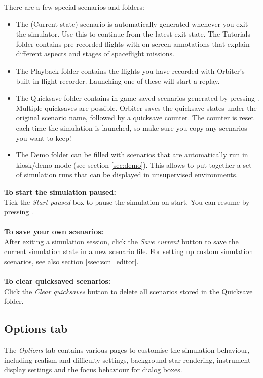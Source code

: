 \documentclass[Orbiter User Manual.tex]{subfiles}
\begin{document}
\begin{figure}[H]
	\centering
\end{figure}

\noindent
There are a few special scenarios and folders:

\begin{itemize}
\item The (Current state) scenario is automatically generated whenever you exit the simulator. Use this to continue from the latest exit state.
The Tutorials folder contains pre-recorded flights with on-screen annotations that explain different aspects and stages of spaceflight missions.
\item The Playback folder contains the flights you have recorded with Orbiter's built-in flight recorder. Launching one of these will start a replay.
\item The Quicksave folder contains in-game saved scenarios generated by pressing \Ctrl{}. Multiple quicksaves are possible. Orbiter saves the quicksave states under the original scenario name, followed by a quicksave counter. The counter is reset each time the simulation is launched, so make sure you copy any scenarios you want to keep!
\item The Demo folder can be filled with scenarios that are automatically run in kiosk/demo mode (see section \ref{sec:demo}). This allows to put together a set of simulation runs that can be displayed in unsupervised environments.
\end{itemize}

\noindent
\textbf{To start the simulation paused:}\\
Tick the \textit{Start paused} box to pause the simulation on start. You can resume by pressing \Ctrl{}.\\
\\
\textbf{To save your own scenarios:}\\
After exiting a simulation session, click the \textit{Save current} button to save the current simulation state in a new scenario file. For setting up custom simulation scenarios, see also section \ref{ssec:scn_editor}.\\
\\
\textbf{To clear quicksaved scenarios:}\\
Click the \textit{Clear quicksaves} button to delete all scenarios stored in the Quicksave folder.


\subsection{Options tab}
\label{ssec:options_tab}
The \textit{Options} tab contains various pages to customise the simulation behaviour, including realism and difficulty settings, background star rendering, instrument display settings and the focus behaviour for dialog boxes.
\end{document}

